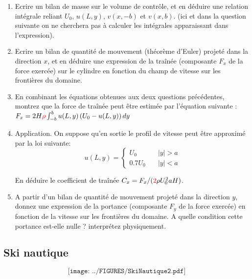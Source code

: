 \begin{enumerate}

\item Ecrire un bilan de masse sur le volume de contrôle, et en déduire une relation intégrale reliant $U_0$, $u(L,y)$, $v(x,-b)$ et $v(x,b)$.
(ici et dans la question suivante on ne cherchera pas à calculer les intégrales apparaissant dans l'expression).


\item Ecrire un bilan de quantité de mouvement (théorème d'Euler) projeté dans la direction $x$, et en déduire une expression de la traînée (composante $F_x$ de la force exercée) sur le cylindre en fonction du champ de vitesse sur les frontières du domaine.



\item En combinant les équations obtenues aux deux questions précédentes, montrez que la force de traînée peut être estimée par l'équation suivante :
$
F_x = 2 H {\color{red} \rho} \int_{-b}^{b} u(L,y) \left( U_0 - u(L,y) \right) dy 
$


\item
Application. On suppose qu'en sortie le profil de vitesse peut être approximé par la loi suivante: 
$$
u(L,y) = \left\{ \begin{array}{ll} U_0 \quad & |y|> a \\ 0.7 U_0 \quad & |y|< a \end{array}
\right.
$$

En déduire le coefficient de traînée $C_x = F_x / ({\color{red}2} \rho U_0^2 a H)$.


\item A partir d'un bilan de quantité de mouvement projeté dans la direction $y$, donnez une expression de la portance (composante $F_y$ de la force exercée) en fonction de la vitesse sur les frontières du domaine. A quelle condition cette portance est-elle nulle ? interprétez physiquement.


\end{enumerate}



\subsection{Ski nautique} 

$$
\texttt{[image: ../FIGURES/SkiNautique2.pdf]}
$$
\vspace{-5cm}

